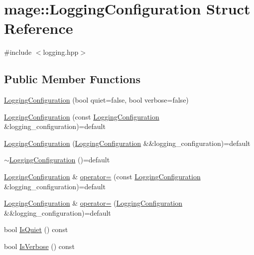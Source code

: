 \hypertarget{structmage_1_1_logging_configuration}{}\section{mage\+:\+:Logging\+Configuration Struct Reference}
\label{structmage_1_1_logging_configuration}


{\ttfamily \#include $<$logging.\+hpp$>$}

\subsection*{Public Member Functions}
\begin{DoxyCompactItemize}
\item 
\hyperlink{structmage_1_1_logging_configuration_ab18d18c78e7104f4c677e6d08f31ca01}{Logging\+Configuration} (bool quiet=false, bool verbose=false)
\item 
\hyperlink{structmage_1_1_logging_configuration_a8e4ccd4301f5544213edd3b600cccff9}{Logging\+Configuration} (const \hyperlink{structmage_1_1_logging_configuration}{Logging\+Configuration} \&logging\+\_\+configuration)=default
\item 
\hyperlink{structmage_1_1_logging_configuration_ad5d3dd901720450fcf57d4b1b32fce15}{Logging\+Configuration} (\hyperlink{structmage_1_1_logging_configuration}{Logging\+Configuration} \&\&logging\+\_\+configuration)=default
\item 
\hyperlink{structmage_1_1_logging_configuration_a842cd1d5cf22c9fb6e2c76e684cd08ee}{$\sim$\+Logging\+Configuration} ()=default
\item 
\hyperlink{structmage_1_1_logging_configuration}{Logging\+Configuration} \& \hyperlink{structmage_1_1_logging_configuration_af35d0b0a2f5743944d3d9d66580074db}{operator=} (const \hyperlink{structmage_1_1_logging_configuration}{Logging\+Configuration} \&logging\+\_\+configuration)=default
\item 
\hyperlink{structmage_1_1_logging_configuration}{Logging\+Configuration} \& \hyperlink{structmage_1_1_logging_configuration_a699285ff50d1bb7573cc0c28bcf476b1}{operator=} (\hyperlink{structmage_1_1_logging_configuration}{Logging\+Configuration} \&\&logging\+\_\+configuration)=default
\item 
bool \hyperlink{structmage_1_1_logging_configuration_ac081313b7a9440bcd73b6a9b69ff3452}{Is\+Quiet} () const
\item 
bool \hyperlink{structmage_1_1_logging_configuration_a13d91de33f888eee31f4d4e6b1237675}{Is\+Verbose} () const
\end{DoxyCompactItemize}
